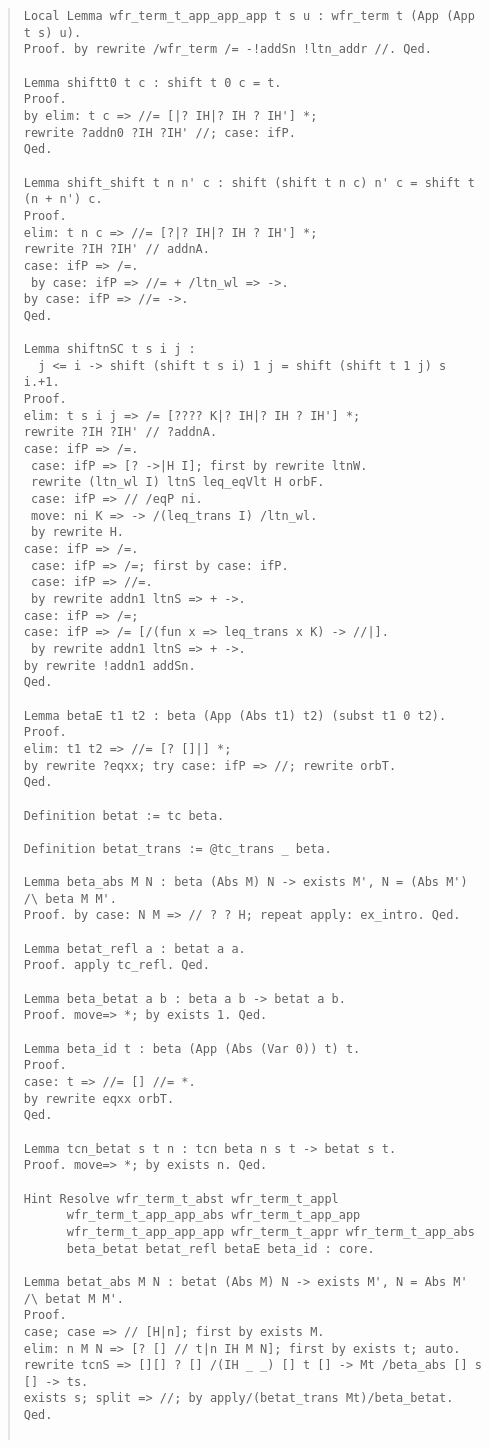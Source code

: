 \documentclass[12pt, titlepage]{ltjsarticle}
\begin{document}
\begin{quote}
\begin{verbatim}
Local Lemma wfr_term_t_app_app_app t s u : wfr_term t (App (App t s) u).
Proof. by rewrite /wfr_term /= -!addSn !ltn_addr //. Qed.

Lemma shiftt0 t c : shift t 0 c = t.
Proof.
by elim: t c => //= [|? IH|? IH ? IH'] *;
rewrite ?addn0 ?IH ?IH' //; case: ifP.
Qed.

Lemma shift_shift t n n' c : shift (shift t n c) n' c = shift t (n + n') c.
Proof.
elim: t n c => //= [?|? IH|? IH ? IH'] *;
rewrite ?IH ?IH' // addnA.
case: ifP => /=.
 by case: ifP => //= + /ltn_wl => ->.
by case: ifP => //= ->.
Qed.

Lemma shiftnSC t s i j :
  j <= i -> shift (shift t s i) 1 j = shift (shift t 1 j) s i.+1.
Proof.
elim: t s i j => /= [???? K|? IH|? IH ? IH'] *; 
rewrite ?IH ?IH' // ?addnA.
case: ifP => /=.
 case: ifP => [? ->|H I]; first by rewrite ltnW.
 rewrite (ltn_wl I) ltnS leq_eqVlt H orbF.
 case: ifP => // /eqP ni.
 move: ni K => -> /(leq_trans I) /ltn_wl.
 by rewrite H.
case: ifP => /=.
 case: ifP => /=; first by case: ifP.
 case: ifP => //=.
 by rewrite addn1 ltnS => + ->.
case: ifP => /=;
case: ifP => /= [/(fun x => leq_trans x K) -> //|].
 by rewrite addn1 ltnS => + ->.
by rewrite !addn1 addSn.
Qed.

Lemma betaE t1 t2 : beta (App (Abs t1) t2) (subst t1 0 t2).
Proof.
elim: t1 t2 => //= [? []|] *;
by rewrite ?eqxx; try case: ifP => //; rewrite orbT.
Qed.

Definition betat := tc beta.

Definition betat_trans := @tc_trans _ beta.

Lemma beta_abs M N : beta (Abs M) N -> exists M', N = (Abs M') /\ beta M M'.
Proof. by case: N M => // ? ? H; repeat apply: ex_intro. Qed.

Lemma betat_refl a : betat a a.
Proof. apply tc_refl. Qed.

Lemma beta_betat a b : beta a b -> betat a b.
Proof. move=> *; by exists 1. Qed.

Lemma beta_id t : beta (App (Abs (Var 0)) t) t.
Proof.
case: t => //= [] //= *.
by rewrite eqxx orbT.
Qed.

Lemma tcn_betat s t n : tcn beta n s t -> betat s t. 
Proof. move=> *; by exists n. Qed.

Hint Resolve wfr_term_t_abst wfr_term_t_appl
      wfr_term_t_app_app_abs wfr_term_t_app_app
      wfr_term_t_app_app_app wfr_term_t_appr wfr_term_t_app_abs
      beta_betat betat_refl betaE beta_id : core.

Lemma betat_abs M N : betat (Abs M) N -> exists M', N = Abs M' /\ betat M M'.
Proof.
case; case => // [H|n]; first by exists M.
elim: n M N => [? [] // t|n IH M N]; first by exists t; auto.
rewrite tcnS => [][] ? [] /(IH _ _) [] t [] -> Mt /beta_abs [] s [] -> ts.
exists s; split => //; by apply/(betat_trans Mt)/beta_betat.
Qed.


\end{verbatim}
\end{quote}
\end{document}
